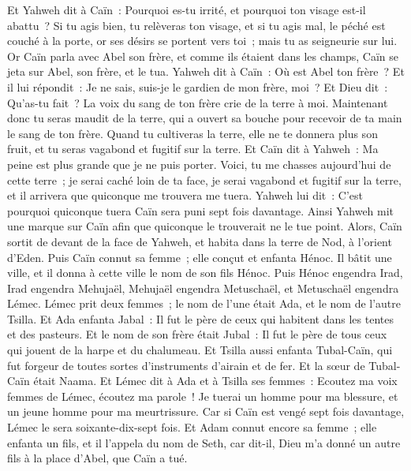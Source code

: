 \begin{multicols}{2}
Et Yahweh dit à Caïn~: Pourquoi es-tu irrité, et pourquoi ton visage est-il abattu~?
Si tu agis bien, tu relèveras ton visage, et si tu agis mal, le péché est couché à la porte, or ses désirs se portent vers toi~; mais tu as seigneurie sur lui.
Or Caïn parla avec Abel son frère, et comme ils étaient dans les champs, Caïn se jeta sur Abel, son frère, et le tua.
Yahweh dit à Caïn~: Où est Abel ton frère~? Et il lui répondit~: Je ne sais, suis-je le gardien de mon frère, moi~?
Et Dieu dit~: Qu'as-tu fait~? La voix du sang de ton frère crie de la terre à moi.
Maintenant donc tu seras maudit de la terre, qui a ouvert sa bouche pour recevoir de ta main le sang de ton frère.
Quand tu cultiveras la terre, elle ne te donnera plus son fruit, et tu seras vagabond et fugitif sur la terre.
Et Caïn dit à Yahweh~: Ma peine est plus grande que je ne puis porter.
Voici, tu me chasses aujourd'hui de cette terre~; je serai caché loin de ta face, je serai vagabond et fugitif sur la terre, et il arrivera que quiconque me trouvera me tuera.
Yahweh lui dit~: C'est pourquoi quiconque tuera Caïn sera puni sept fois davantage. Ainsi Yahweh mit une marque sur Caïn afin que quiconque le trouverait ne le tue point.
Alors, Caïn sortit de devant de la face de Yahweh, et habita dans la terre de Nod, à l'orient d'Eden.
Puis Caïn connut sa femme~; elle conçut et enfanta Hénoc. Il bâtit une ville, et il donna à cette ville le nom de son fils Hénoc.
Puis Hénoc engendra Irad, Irad engendra Mehujaël, Mehujaël engendra Metuschaël, et Metuschaël engendra Lémec.
Lémec prit deux femmes~; le nom de l'une était Ada, et le nom de l'autre Tsilla.
Et Ada enfanta Jabal~: Il fut le père de ceux qui habitent dans les tentes et des pasteurs.
Et le nom de son frère était Jubal~: Il fut le père de tous ceux qui jouent de la harpe et du chalumeau.
Et Tsilla aussi enfanta Tubal-Caïn, qui fut forgeur de toutes sortes d'instruments d'airain et de fer. Et la sœur de Tubal-Caïn était Naama.
Et Lémec dit à Ada et à Tsilla ses femmes~: Ecoutez ma voix femmes de Lémec, écoutez ma parole~! Je tuerai un homme pour ma blessure, et un jeune homme pour ma meurtrissure.
Car si Caïn est vengé sept fois davantage, Lémec le sera soixante-dix-sept fois.
Et Adam connut encore sa femme~; elle enfanta un fils, et il l'appela du nom de Seth, car dit-il, Dieu m'a donné un autre fils à la place d'Abel, que Caïn a tué.

\end{multicols}
